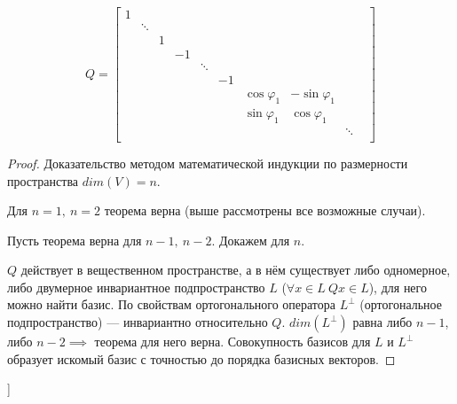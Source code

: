 $$ Q = \begin{bmatrix} 
            1 &    &   &   &   &   &   &   &   &   \\
              & \ddots  &  &   &   &   &   &   &   &   \\
              &  & 1  &    &   &   &   &   &   &   \\
              &   &   & -1 &   &   &   &   &   &   \\
              &   &   &  & \ddots &   &   &   &   \\
              &   &   &   &   & -1 &   &   &   &   \\
              &   &   &   &   &   & \cos\varphi_1 & -\sin\varphi_1 &  \\
              &   &   &   &   &   & \sin\varphi_1 & \cos\varphi_1 &  \\
              &   &   &   &   &   &   &   & \ddots\\
        \end{bmatrix} $$

\begin{proof} Доказательство методом математической индукции по размерности пространства $dim(V)=n$.

Для $n=1,~n=2$ теорема верна (выше рассмотрены все возможные случаи).

Пусть теорема верна для $n-1,~n-2$. Докажем для $n$. 

$Q$ действует в вещественном пространстве, а в нём существует либо одномерное, либо двумерное инвариантное подпространство $L$ ($\forall x \in L~Qx \in L$), для него можно найти базис. По свойствам ортогонального оператора $L^{\perp}$ (ортогональное подпространство) --- инвариантно относительно $Q$. $dim(L^{\perp})$ равна либо $n-1$, либо $n-2 \implies$ теорема для него верна. Совокупность базисов для $L$ и $L^{\perp}$ образует искомый базис с точностью до порядка базисных векторов.
\end{proof}


\bigbreak
[\cite[page 230-233, 292-295]{kim}]